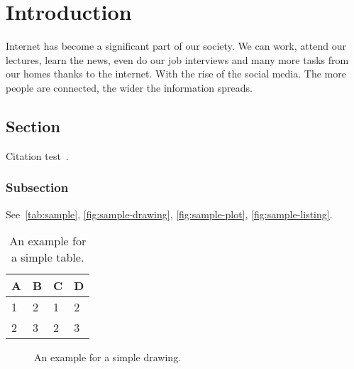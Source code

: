 
\chapter{Introduction}\label{chapter:introduction}

Internet has become a significant part of our society. We can work, attend our lectures, learn the news, even do our job interviews and many more tasks from our homes thanks to the internet. With the rise of the social media. The more people are connected, the wider the information spreads. 

\section{Section}
Citation test~\parencite{latex}.

\subsection{Subsection}

See~\autoref{tab:sample}, \autoref{fig:sample-drawing}, \autoref{fig:sample-plot}, \autoref{fig:sample-listing}.

\begin{table}[htpb]
  \caption[Example table]{An example for a simple table.}\label{tab:sample}
  \centering
  \begin{tabular}{l l l l}
    \toprule
      A & B & C & D \\
    \midrule
      1 & 2 & 1 & 2 \\
      2 & 3 & 2 & 3 \\
    \bottomrule
  \end{tabular}
\end{table}

\begin{figure}[htpb]
  \centering
  \caption[Example drawing]{An example for a simple drawing.}\label{fig:sample-drawing}
\end{figure}


